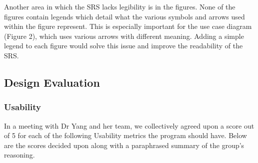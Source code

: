 \documentclass[12pt, titlepage]{article}
\begin{document}
Another area in which the SRS lacks legibility is in the figures. None of the figures contain legends which detail what the various symbols and arrows used within the figure represent. This is especially important for the use case diagram (Figure 2), which uses various arrows with different meaning. Adding a simple legend to each figure would solve this issue and improve the readability of the SRS.

\subsection{Design Evaluation}
\subsubsection{Usability} In a meeting with Dr Yang and her team, we collectively agreed upon a score out of 5 for each of the following Usability metrics the program should 
have. Below are the scores decided upon along with a paraphrased summary of the group's reasoning.\\
\end{document}
